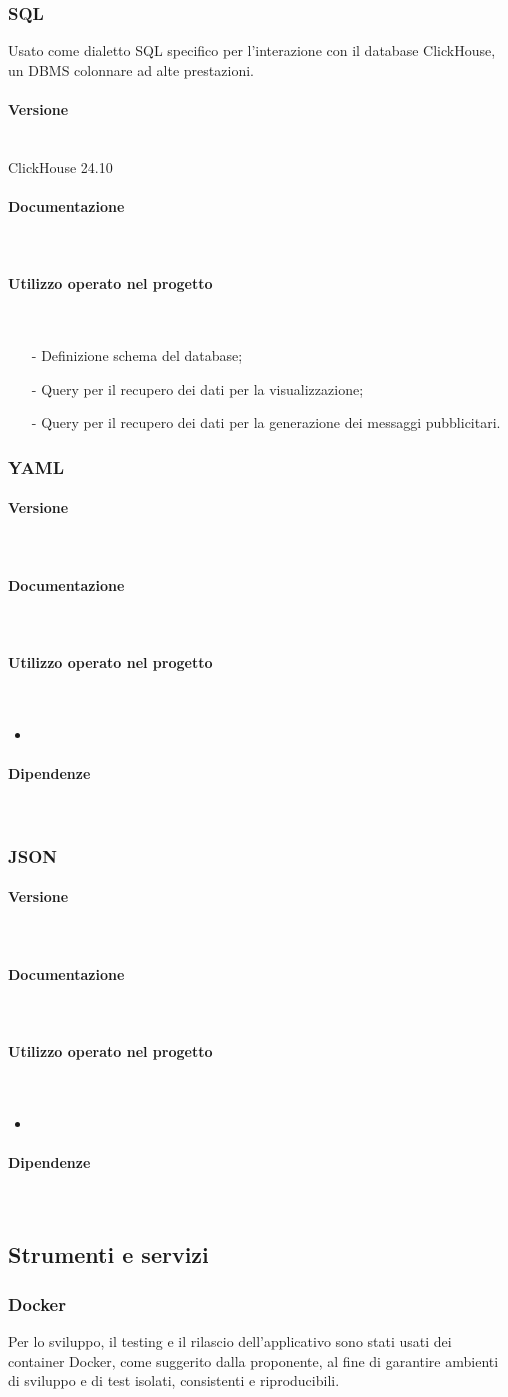 \documentclass[10pt]{article}
\newcommand{\myparagraph}[1]{\paragraph{#1}\mbox{}\\\vspace{0.4em}}
\begin{document}
\begin{justify}
        \subsubsection{SQL}
        Usato come dialetto SQL specifico per l'interazione con il database ClickHouse, un DBMS colonnare ad alte prestazioni.
            \myparagraph{Versione}
                ClickHouse 24.10
            \myparagraph{Documentazione}
            \myparagraph{Utilizzo operato nel progetto}
                \begin{itemize}
                    \item[-] Definizione schema del database;
                    \item[-] Query per il recupero dei dati per la visualizzazione;
                    \item[-] Query per il recupero dei dati per la generazione dei messaggi pubblicitari.
                \end{itemize}

        \subsubsection{YAML}
            \myparagraph{Versione}
            \myparagraph{Documentazione}
            \myparagraph{Utilizzo operato nel progetto}
                \begin{itemize}
                    \item
                \end{itemize}
            \myparagraph{Dipendenze}

        \subsubsection{JSON}
            \myparagraph{Versione}
            \myparagraph{Documentazione}
            \myparagraph{Utilizzo operato nel progetto}
                \begin{itemize}
                    \item
                \end{itemize}
            \myparagraph{Dipendenze}

    \subsection{Strumenti e servizi}
        \subsubsection{Docker}
        Per lo sviluppo, il testing e il rilascio dell'applicativo sono stati usati dei container Docker, come suggerito dalla proponente, al fine di garantire ambienti di 
        sviluppo e di test isolati, consistenti e riproducibili.\\




\end{justify}
\end{document}
